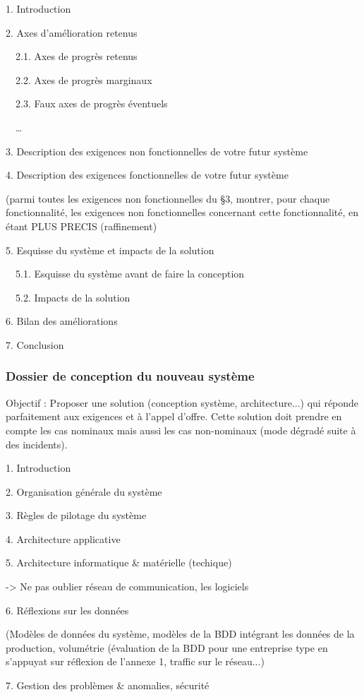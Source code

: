 \documentclass{mise_en_page}
\begin{document}
1. Introduction

2. Axes d’amélioration retenus

\ \ 2.1. Axes de progrès retenus

\ \ 2.2. Axes de progrès marginaux

\ \ 2.3. Faux axes de progrès éventuels

\ \ …

3. Description des exigences non fonctionnelles de votre futur système

4. Description des exigences fonctionnelles de votre futur système

(parmi toutes les exigences non fonctionnelles du §3, montrer, pour
chaque fonctionnalité, les exigences non fonctionnelles concernant
cette fonctionnalité, en étant PLUS PRECIS (raffinement)

5. Esquisse du système et impacts de la solution

\ \ 5.1. Esquisse du système avant de faire la conception

\ \ 5.2. Impacts de la solution

6. Bilan des améliorations

7. Conclusion

\subsubsection{Dossier de conception du nouveau système}
Objectif : Proposer une solution (conception système, architecture...)
qui réponde parfaitement aux exigences et à l’appel d’offre. Cette
solution doit prendre en compte les cas nominaux mais aussi les cas
non-nominaux (mode dégradé suite à des incidents).

1. Introduction

2. Organisation générale du système

3. Règles de pilotage du système

4. Architecture applicative

5. Architecture informatique \& matérielle (techique)

{}-{\textgreater} Ne pas oublier réseau de communication, les logiciels

6. Réflexions sur les données

(Modèles de données du système, modèles de la BDD intégrant les données
de la production, volumétrie (évaluation de la BDD pour une entreprise
type en s’appuyat sur réflexion de l’annexe 1, traffic sur le
réseau...)

7. Gestion des problèmes \& anomalies, sécurité
\end{document}

